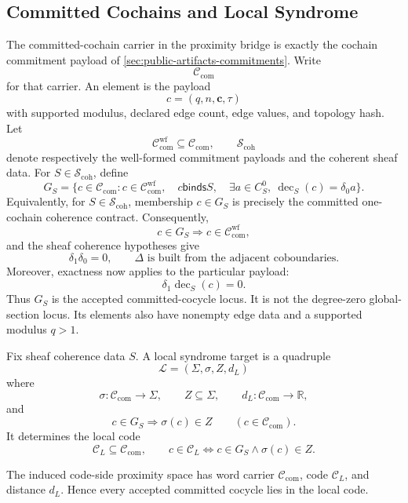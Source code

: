 \subsection{Committed Cochains and Local Syndrome}

The committed-cochain carrier in the proximity bridge is exactly the cochain
commitment payload of \cref{sec:public-artifacts-commitments}. Write
\[
  \mathcal C_{\mathrm{com}}
\]
for that carrier. An element is the payload
\[
  c=(q,n,\mathbf c,\tau)
\]
with supported modulus, declared edge count, edge values, and topology hash.
Let
\[
  \mathcal C_{\mathrm{com}}^{\mathrm{wf}}\subseteq\mathcal C_{\mathrm{com}},
  \qquad
  \mathcal S_{\mathrm{coh}}
\]
denote respectively the well-formed commitment payloads and the coherent sheaf
data. For \(S\in\mathcal S_{\mathrm{coh}}\), define
\[
  G_S=\{c\in\mathcal C_{\mathrm{com}}:
  c\in\mathcal C_{\mathrm{com}}^{\mathrm{wf}},\quad
  c\mathrel{\mathsf{binds}}S,\quad
  \exists a\in C_S^0,\ \operatorname{dec}_S(c)=\delta_0a\}.
\]
Equivalently, for \(S\in\mathcal S_{\mathrm{coh}}\), membership
\(c\in G_S\) is precisely the committed one-cochain coherence contract.
Consequently,
\[
  c\in G_S
  \Longrightarrow
  c\in\mathcal C_{\mathrm{com}}^{\mathrm{wf}},
\]
and the sheaf coherence hypotheses give
\[
  \delta_1\delta_0=0,
  \qquad
  \Delta\text{ is built from the adjacent coboundaries}.
\]
Moreover, exactness now applies to the particular payload:
\[
  \delta_1\operatorname{dec}_S(c)=0.
\]
Thus \(G_S\) is the accepted committed-cocycle locus. It is not the
degree-zero global-section locus. Its elements also have nonempty edge data
and a supported modulus \(q>1\).

\begin{definition}\label{def:local-syndrome-target}
Fix sheaf coherence data \(S\). A local syndrome target is a quadruple
\[
  \mathcal L=(\Sigma,\sigma,Z,d_L)
\]
where
\[
  \sigma:\mathcal C_{\mathrm{com}}\to\Sigma,\qquad
  Z\subseteq\Sigma,\qquad
  d_L:\mathcal C_{\mathrm{com}}\to\mathbb R,
\]
and
\[
  c\in G_S\Longrightarrow \sigma(c)\in Z
  \qquad(c\in\mathcal C_{\mathrm{com}}).
\]
It determines the local code
\[
  \mathcal C_L\subseteq\mathcal C_{\mathrm{com}},\qquad
  c\in\mathcal C_L
  \Longleftrightarrow
  c\in G_S\wedge \sigma(c)\in Z.
\]
\end{definition}

The induced code-side proximity space has word carrier
\(\mathcal C_{\mathrm{com}}\), code \(\mathcal C_L\), and distance \(d_L\).
Hence every accepted committed cocycle lies in the local code.

